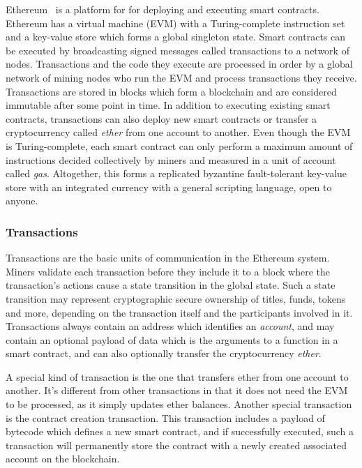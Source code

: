 Ethereum~\cite{wood2018ethereum} is a platform for for deploying and executing smart contracts. Ethereum has a virtual machine (EVM) with a Turing-complete instruction set and a key-value store which forms a global singleton state. Smart contracts can be executed by broadcasting signed messages called transactions to a network of nodes. Transactions and the code they execute are processed in order by a global network of mining nodes who run the EVM and process transactions they receive. Transactions are stored in blocks which form a blockchain and are considered immutable after some point in time. In addition to executing existing smart contracts, transactions can also deploy new smart contracts or transfer a cryptocurrency called \emph{ether} from one account to another. Even though the EVM is Turing-complete, each smart contract can only perform a maximum amount of instructions decided collectively by miners and measured in a unit of account called \emph{gas}. Altogether, this forms a replicated byzantine fault-tolerant key-value store with an integrated currency with a general scripting language, open to anyone.

\subsubsection{Transactions}
Transactions are the basic units of communication in the Ethereum system. Miners validate each transaction before they include it to a block where the transaction's actions cause a state transition in the global state. Such a state transition may represent cryptographic secure ownership of titles, funds, tokens and more, depending on the transaction itself and the participants involved in it. Transactions always contain an address which identifies an \emph{account}, and may contain an optional payload of data which is the arguments to a function in a smart contract, and can also optionally transfer the cryptocurrency \emph{ether}. 

A special kind of transaction is the one that transfers ether from one account to another. It's different from other transactions in that it does not need the EVM to be processed, as it simply updates ether balances. Another special transaction is the contract creation transaction. This transaction includes a payload of bytecode which defines a new smart contract, and if successfully executed, such a transaction will permanently store the contract with a newly created associated account on the blockchain.


